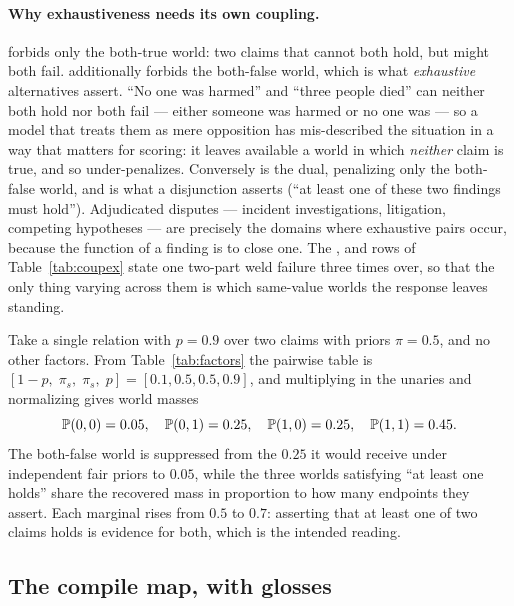 \paragraph{Why exhaustiveness needs its own coupling.} \con{} forbids only the both-true world: two
claims that cannot both hold, but might both fail. \exc{} additionally forbids the both-false
world, which is what \emph{exhaustive} alternatives assert. ``No one was harmed'' and ``three
people died'' can neither both hold nor both fail --- either someone was harmed or no one was ---
so a model that treats them as mere opposition has mis-described the situation in a way that
matters for scoring: it leaves available a world in which \emph{neither} claim is true, and so
under-penalizes. Conversely \cnc{} is the dual, penalizing only the both-false world, and is what a
disjunction asserts (``at least one of these two findings must hold''). Adjudicated disputes ---
incident investigations, litigation, competing hypotheses --- are precisely the domains where
exhaustive pairs occur, because the function of a finding is to close one. The \con{}, \exc{} and
\cnc{} rows of Table~\ref{tab:coupex} state one two-part weld failure three times over, so that
the only thing varying across them is which same-value worlds the response leaves standing.

\begin{example}
\label{ex-cnc}
Take a single \cnc{} relation with $p=0.9$ over two claims with priors $\pi=0.5$, and no other
factors. From Table~\ref{tab:factors} the pairwise table is $[1-p,\;\pi_s,\;\pi_s,\;p]
=[0.1,0.5,0.5,0.9]$, and multiplying in the unaries and normalizing gives world masses
\[
\mathbb{P}\!\left( 0,0 \right)=0.05,\quad \mathbb{P}\!\left( 0,1 \right)=0.25,\quad \mathbb{P}\!\left( 1,0 \right)=0.25,\quad \mathbb{P}\!\left( 1,1 \right)=0.45 .
\]
The both-false world is suppressed from the $0.25$ it would receive under independent fair priors
to $0.05$, while the three worlds satisfying ``at least one holds'' share the recovered mass in
proportion to how many endpoints they assert. Each marginal rises from $0.5$ to $0.7$: asserting
that at least one of two claims holds is evidence for both, which is the intended reading.
\end{example}


\subsection{The compile map, with glosses}

